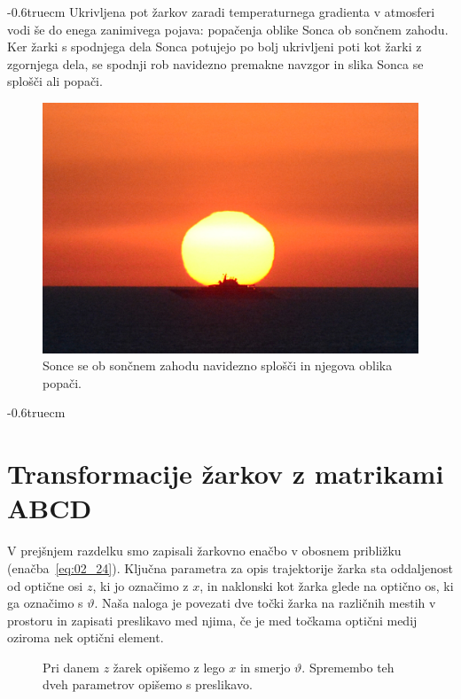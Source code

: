 \vglue-0.6truecm
Ukrivljena pot žarkov zaradi temperaturnega gradienta v atmosferi
vodi še do enega zanimivega pojava: popačenja oblike Sonca ob sončnem 
zahodu. Ker žarki s spodnjega dela Sonca potujejo po bolj ukrivljeni
poti kot žarki z zgornjega dela, se spodnji rob navidezno premakne navzgor 
in slika Sonca se splošči ali popači.
\begin{figure}[ht]
\centering
\includegraphics[width=5truecm]{slike/02_Sonce.jpg}
\caption{Sonce se ob sončnem zahodu navidezno splošči in njegova oblika popači.}
\label{fig:02_Sonce}
\end{figure}
\vglue-0.6truecm
\section{Transformacije žarkov z matrikami ABCD}
V prejšnjem razdelku smo zapisali žarkovno enačbo v obosnem 
približku (enačba~\ref{eq:02_24}). Ključna parametra za opis trajektorije žarka sta 
oddaljenost od optične osi $z$, ki jo označimo z $x$, in naklonski 
kot žarka glede na optično os, ki ga označimo s $\vartheta$.
Naša naloga je povezati dve točki žarka na različnih mestih v
prostoru in zapisati preslikavo med njima, če je med točkama
optični medij oziroma nek optični element. 
\begin{figure}[ht]
\centering
\def\svgwidth{90truemm} 

\caption{Pri danem $z$ žarek opišemo z lego $x$ in smerjo $\vartheta$. Spremembo
teh dveh parametrov opišemo s preslikavo.}
\label{fig:01_ABCD0}
\end{figure}

